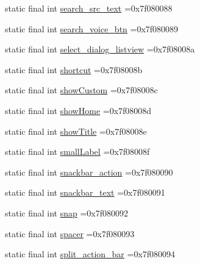 \begin{DoxyCompactItemize}
\item 
static final int \mbox{\hyperlink{classbr_1_1unb_1_1cic_1_1mp_1_1marketmaster_1_1test_1_1R_1_1id_a6d5057700f09f38ad8b3265c445f777f}{search\+\_\+src\+\_\+text}} =0x7f080088
\item 
static final int \mbox{\hyperlink{classbr_1_1unb_1_1cic_1_1mp_1_1marketmaster_1_1test_1_1R_1_1id_ad5babe9b15a816a83572d27275e188df}{search\+\_\+voice\+\_\+btn}} =0x7f080089
\item 
static final int \mbox{\hyperlink{classbr_1_1unb_1_1cic_1_1mp_1_1marketmaster_1_1test_1_1R_1_1id_a4c22a3ef9b66444e111367ce0a084630}{select\+\_\+dialog\+\_\+listview}} =0x7f08008a
\item 
static final int \mbox{\hyperlink{classbr_1_1unb_1_1cic_1_1mp_1_1marketmaster_1_1test_1_1R_1_1id_a8ac03bafa262c86a53fae2cf7af24a64}{shortcut}} =0x7f08008b
\item 
static final int \mbox{\hyperlink{classbr_1_1unb_1_1cic_1_1mp_1_1marketmaster_1_1test_1_1R_1_1id_a256040de44ab51db7539b6f563939df8}{show\+Custom}} =0x7f08008c
\item 
static final int \mbox{\hyperlink{classbr_1_1unb_1_1cic_1_1mp_1_1marketmaster_1_1test_1_1R_1_1id_a7d1132d9b93bf593800d8e7eb50efe02}{show\+Home}} =0x7f08008d
\item 
static final int \mbox{\hyperlink{classbr_1_1unb_1_1cic_1_1mp_1_1marketmaster_1_1test_1_1R_1_1id_ad43f4e6685322873e704634a75be195e}{show\+Title}} =0x7f08008e
\item 
static final int \mbox{\hyperlink{classbr_1_1unb_1_1cic_1_1mp_1_1marketmaster_1_1test_1_1R_1_1id_acf77fad5783b2e34c6b3bb7dadfa8912}{small\+Label}} =0x7f08008f
\item 
static final int \mbox{\hyperlink{classbr_1_1unb_1_1cic_1_1mp_1_1marketmaster_1_1test_1_1R_1_1id_ad05735e2c17c3663c3ba230a3a9c42e7}{snackbar\+\_\+action}} =0x7f080090
\item 
static final int \mbox{\hyperlink{classbr_1_1unb_1_1cic_1_1mp_1_1marketmaster_1_1test_1_1R_1_1id_ac31e9394c4750aa82ef8c829fed9285f}{snackbar\+\_\+text}} =0x7f080091
\item 
static final int \mbox{\hyperlink{classbr_1_1unb_1_1cic_1_1mp_1_1marketmaster_1_1test_1_1R_1_1id_a27a15dd832f0cb9e2081137e5f765e3a}{snap}} =0x7f080092
\item 
static final int \mbox{\hyperlink{classbr_1_1unb_1_1cic_1_1mp_1_1marketmaster_1_1test_1_1R_1_1id_af4b0e411b351d87608f589e7cf49cee2}{spacer}} =0x7f080093
\item 
static final int \mbox{\hyperlink{classbr_1_1unb_1_1cic_1_1mp_1_1marketmaster_1_1test_1_1R_1_1id_a9bb3f0115a6dc5f9537319ac6ec754af}{split\+\_\+action\+\_\+bar}} =0x7f080094

\end{DoxyCompactItemize}
